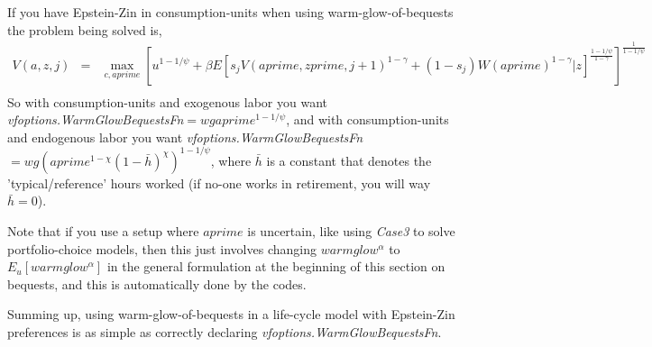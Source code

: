 If you have Epstein-Zin in consumption-units when using warm-glow-of-bequests the problem being solved is,
\begin{eqnarray*}
 V(a,z,j)&=& \max_{c,aprime} \left[ u^{1-1/\psi} + \beta E[ s_j V(aprime,zprime,j+1)^{1-\gamma}+(1-s_j) W(aprime)^{1-\gamma}|z] ^{\frac{1-1/\psi}{1-\gamma}}\right]^{\frac{1}{1-1/\psi}}\\
\end{eqnarray*}
So with consumption-units and exogenous labor you want \textit{vfoptions.WarmGlowBequestsFn}$=wg aprime^{1-1/\psi}$, and with consumption-units and endogenous labor you want \textit{vfoptions.WarmGlowBequestsFn}$=wg (aprime^{1-\chi}(1-\bar{h})^{\chi})^{1-1/\psi}$, where $\bar{h}$ is a constant that denotes the 'typical/reference' hours worked (if no-one works in retirement, you will way $\bar{h}=0$).

Note that if you use a setup where $aprime$ is uncertain, like using \textit{Case3} to solve portfolio-choice models, then this just involves changing $warmglow^{\alpha}$ to $E_u[warmglow^{\alpha}]$ in the general formulation at the beginning of this section on bequests, and this is automatically done by the codes.

Summing up, using warm-glow-of-bequests in a life-cycle model with Epstein-Zin preferences is as simple as correctly declaring \textit{vfoptions.WarmGlowBequestsFn}.
